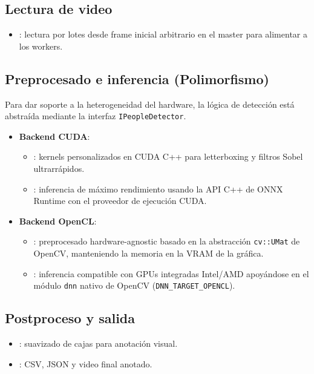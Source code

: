 \documentclass[11pt,a4paper]{article}
\begin{document}
\subsection{Lectura de video}
\begin{itemize}[leftmargin=*]
  \item {}: lectura por lotes desde frame inicial arbitrario en el master para alimentar a los workers.
\end{itemize}

\subsection{Preprocesado e inferencia (Polimorfismo)}
Para dar soporte a la heterogeneidad del hardware, la l\'ogica de detecci\'on est\'a abstra\'ida mediante la interfaz \texttt{IPeopleDetector}.
\begin{itemize}[leftmargin=*]
  \item \textbf{Backend CUDA}:
  \begin{itemize}[leftmargin=*]
    \item {}: kernels personalizados en CUDA C++ para letterboxing y filtros Sobel ultrarr\'apidos.
    \item {}: inferencia de m\'aximo rendimiento usando la API C++ de ONNX Runtime con el proveedor de ejecuci\'on CUDA.
  \end{itemize}
  \item \textbf{Backend OpenCL}:
  \begin{itemize}[leftmargin=*]
    \item {}: preprocesado hardware-agnostic basado en la abstracci\'on \texttt{cv::UMat} de OpenCV, manteniendo la memoria en la VRAM de la gr\'afica.
    \item {}: inferencia compatible con GPUs integradas Intel/AMD apoy\'andose en el m\'odulo \texttt{dnn} nativo de OpenCV (\texttt{DNN\_TARGET\_OPENCL}).
  \end{itemize}
\end{itemize}

\subsection{Postproceso y salida}
\begin{itemize}[leftmargin=*]
  \item {}: suavizado de cajas para anotaci\'on visual.
  \item {}: CSV, JSON y video final anotado.
\end{itemize}
\end{document}
